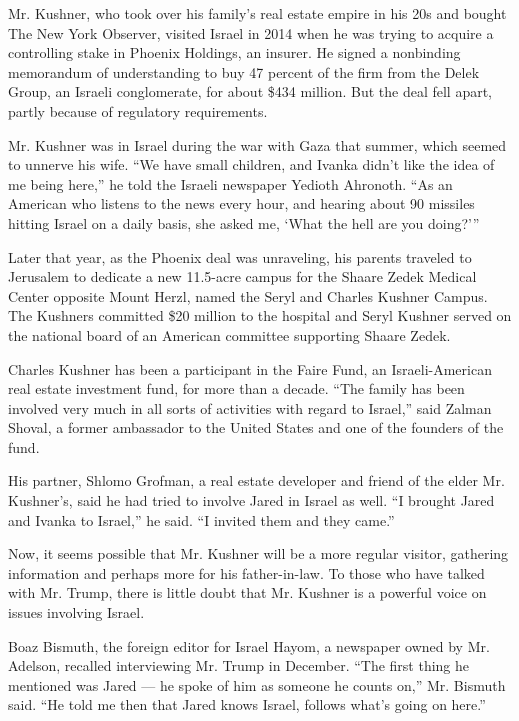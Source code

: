 Mr. Kushner, who took over his family's real estate empire in his 20s
and bought The New York Observer, visited Israel in 2014 when he was
trying to acquire a controlling stake in Phoenix Holdings, an insurer.
He signed a nonbinding memorandum of understanding to buy 47 percent of
the firm from the Delek Group, an Israeli conglomerate, for about \$434
million. But the deal fell apart, partly because of regulatory
requirements.

Mr. Kushner was in Israel during the war with Gaza that summer, which
seemed to unnerve his wife. ``We have small children, and Ivanka didn't
like the idea of me being here,'' he told the Israeli newspaper Yedioth
Ahronoth. ``As an American who listens to the news every hour, and
hearing about 90 missiles hitting Israel on a daily basis, she asked me,
`What the hell are you doing?'''

Later that year, as the Phoenix deal was unraveling, his parents
traveled to Jerusalem to dedicate a new 11.5-acre campus for the Shaare
Zedek Medical Center opposite Mount Herzl, named the Seryl and Charles
Kushner Campus. The Kushners committed \$20 million to the hospital and
Seryl Kushner served on the national board of an American committee
supporting Shaare Zedek.

Charles Kushner has been a participant in the Faire Fund, an
Israeli-American real estate investment fund, for more than a decade.
``The family has been involved very much in all sorts of activities with
regard to Israel,'' said Zalman Shoval, a former ambassador to the
United States and one of the founders of the fund.

His partner, Shlomo Grofman, a real estate developer and friend of the
elder Mr. Kushner's, said he had tried to involve Jared in Israel as
well. ``I brought Jared and Ivanka to Israel,'' he said. ``I invited
them and they came.''

Now, it seems possible that Mr. Kushner will be a more regular visitor,
gathering information and perhaps more for his father-in-law. To those
who have talked with Mr. Trump, there is little doubt that Mr. Kushner
is a powerful voice on issues involving Israel.

Boaz Bismuth, the foreign editor for Israel Hayom, a newspaper owned by
Mr. Adelson, recalled interviewing Mr. Trump in December. ``The first
thing he mentioned was Jared --- he spoke of him as someone he counts
on,'' Mr. Bismuth said. ``He told me then that Jared knows Israel,
follows what's going on here.''


